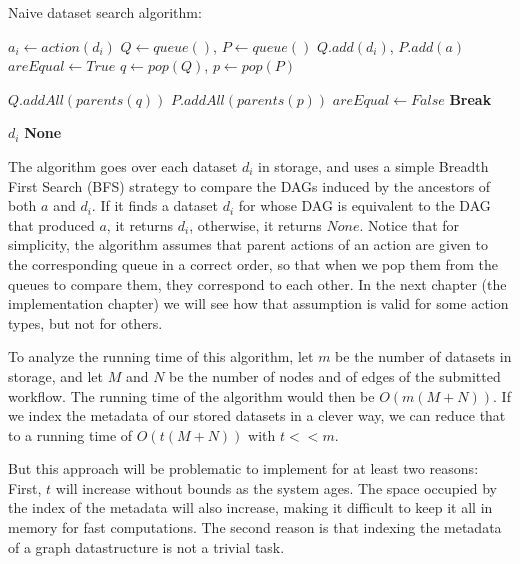\begin{algorithm}
\begin{singlespace}
\caption{Naive dataset search algorithm:}
\begin{algorithmic}[1]
		\State $a_i \gets action(d_i)$ 
		\State $Q \gets queue()$, $P \gets queue()$
		\State $Q.add(d_i)$, $P.add(a)$
		\State $areEqual \gets True$
			\State $q \gets pop(Q)$, $p \gets pop(P)$
			
				\State $Q.addAll(parents(q))$ 
				\State $P.addAll(parents(p))$ 
			\Else
				\State $areEqual \gets False$
				\State \textbf{Break}
			\EndIf
			
		\EndWhile
			\Return $d_i$
		\EndIf
	\EndFor
	\Return \textbf{None}
\EndProcedure
\end{algorithmic}
\end{singlespace}

\end{algorithm}

The algorithm goes over each dataset $d_i$ in storage, and uses a simple Breadth First Search (BFS) strategy to compare the DAGs induced by the ancestors of both $a$ and $d_i$.  If it finds a dataset $d_i$ for whose DAG is equivalent to the DAG that produced $a$, it returns $d_i$, otherwise, it returns $None$.  Notice that for simplicity, the algorithm assumes that parent actions of an action are given to the corresponding queue in a correct order, so that when we pop them from the queues to compare them, they correspond to each other.  In the next chapter (the implementation chapter) we will see how that assumption is valid for some action types, but not for others.

To analyze the running time of this algorithm, let $m$ be the number of datasets in storage, and let $M$ and $N$ be the number of nodes and of edges of the submitted workflow.  The running time of the algorithm would then be $O(m (M + N))$.  If we index the metadata of our stored datasets in a clever way, we can reduce that to a running time of $O(t (M + N))$ with $t << m$.

But this approach will be problematic to implement for at least two reasons: First, $t$ will increase without bounds as the system ages. The space occupied by the index of the metadata will also increase, making it difficult to keep it all in memory for fast computations. The second reason is that indexing the metadata of a graph datastructure is not a trivial task.

